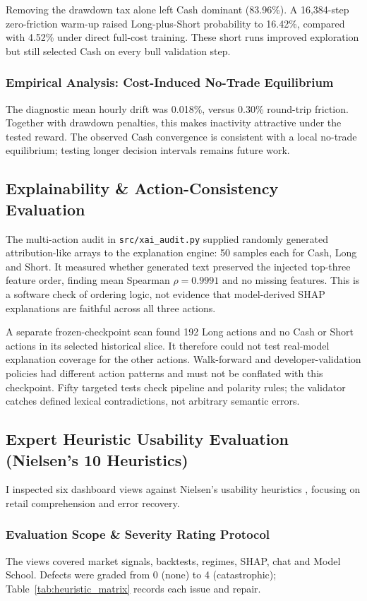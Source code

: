 \documentclass[11pt,a4paper]{article}
\begin{document}
Removing the drawdown tax alone left Cash dominant (83.96\%). A 16,384-step zero-friction warm-up raised Long-plus-Short probability to 16.42\%, compared with 4.52\% under direct full-cost training. These short runs improved exploration but still selected Cash on every bull validation step.

\subsubsection{Empirical Analysis: Cost-Induced No-Trade Equilibrium}
The diagnostic mean hourly drift was 0.018\%, versus 0.30\% round-trip friction. Together with drawdown penalties, this makes inactivity attractive under the tested reward. The observed Cash convergence is consistent with a local no-trade equilibrium; testing longer decision intervals remains future work.

\subsection{Explainability \& Action-Consistency Evaluation}
\label{sec:xai_eval}
The multi-action audit in \texttt{src/xai\_audit.py} supplied randomly generated attribution-like arrays to the explanation engine: 50 samples each for Cash, Long and Short. It measured whether generated text preserved the injected top-three feature order, finding mean Spearman $\rho=0.9991$ and no missing features. This is a software check of ordering logic, not evidence that model-derived SHAP explanations are faithful across all three actions.

A separate frozen-checkpoint scan found 192 Long actions and no Cash or Short actions in its selected historical slice. It therefore could not test real-model explanation coverage for the other actions. Walk-forward and developer-validation policies had different action patterns and must not be conflated with this checkpoint. Fifty targeted tests check pipeline and polarity rules; the validator catches defined lexical contradictions, not arbitrary semantic errors.

\subsection{Expert Heuristic Usability Evaluation (Nielsen's 10 Heuristics)}
I inspected six dashboard views against Nielsen's usability heuristics \cite{nielsen1994}, focusing on retail comprehension and error recovery.

\subsubsection{Evaluation Scope \& Severity Rating Protocol}
The views covered market signals, backtests, regimes, SHAP, chat and Model School. Defects were graded from 0 (none) to 4 (catastrophic); Table~\ref{tab:heuristic_matrix} records each issue and repair.
\end{document}
